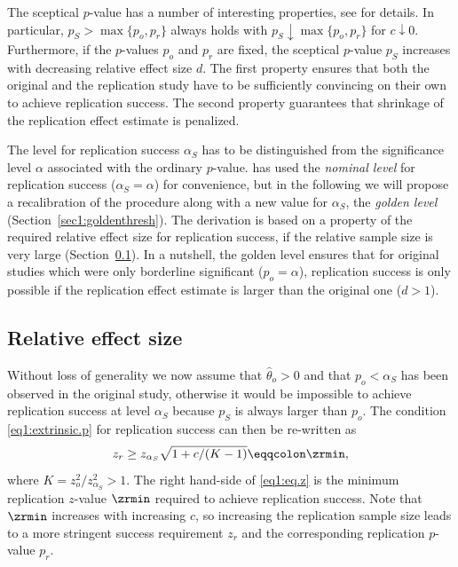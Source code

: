 The sceptical $p$-value has a number of interesting properties, see
\citet[Section 3.1]{Held2020} for details. In particular,
$p_S > \max\{p_o, p_r\}$ always holds with $p_S \downarrow \max\{p_o, p_r\}$ for
$c \downarrow 0$. Furthermore, if the $p$-values $p_o$ and $p_r$ are fixed, the
sceptical $p$-value $p_S$ increases with decreasing relative effect size $d$.
The first property ensures that both the original and the replication study have
to be sufficiently convincing on their own to achieve replication success. The
second property guarantees that shrinkage of the replication effect estimate is
penalized.

The level for replication success $\alpha_S$ has to be distinguished from the
significance level $\alpha$ associated with the ordinary $p$-value.
\citet{Held2020} has used the \textit{nominal level} for replication success
($\alpha_S=\alpha$) for convenience, but in the following we will propose a
recalibration of the procedure along with a new value for $\alpha_S$, the
\textit{golden level} (Section~\ref{sec1:goldenthresh}). The derivation is based
on a property of the required relative effect size for replication success, if
the relative sample size is very large (Section~\ref{sec1:res}). In a nutshell,
the golden level ensures that for original studies which were only borderline
significant ($p_o=\alpha$), replication success is only possible if the
replication
effect estimate is larger than the original one ($d > 1$).\\


\subsection{Relative effect size}\label{sec1:res}
Without loss of generality we now assume that $\hat \theta_o > 0$ and that
$p_o < {\alpha_S}$ has been observed in the original study, otherwise it would
be impossible to achieve replication success at level $\alpha_S$ because $p_S$
is always larger than $p_o$. The condition \eqref{eq1:extrinsic.p} for
replication success can then be re-written as
\begin{equation}\label{eq1:eq.z}
  z_r \geq   z_{{\alpha_S}} \sqrt{1+c/(K-1)} \eqqcolon  \zrmin,
\end{equation}
where $K=z_o^2/z_{{\alpha_S}}^2>1$. The right hand-side of \eqref{eq1:eq.z} is
the minimum replication $z$-value $\zrmin$ required to achieve replication
success. Note that $\zrmin$ increases with increasing $c$, so increasing the
replication sample size leads to a more stringent success requirement $z_r$ and
the corresponding replication $p$-value $p_r$.

